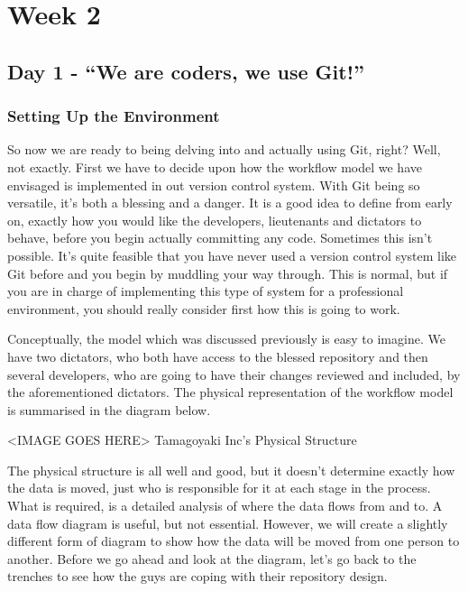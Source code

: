\chapter{Week 2}
\section{Day 1 - ``We are coders, we use Git!''}
\subsection{Setting Up the Environment}

So now we are ready to being delving into and actually using Git, right?  Well, not exactly.  First we have to decide upon how the workflow model we have envisaged is implemented in out version control system.  With Git being so versatile, it's both a blessing and a danger.  It is a good idea to define from early on, exactly how you would like the developers, lieutenants and dictators to behave, before you begin actually committing any code.  Sometimes this isn't possible.  It's quite feasible that you have never used a version control system like Git before and you begin by muddling your way through.  This is normal, but if you are in charge of implementing this type of system for a professional environment, you should really consider first how this is going to work. 

Conceptually, the model which was discussed previously is easy to imagine.  We have two dictators, who both have access to the blessed repository and then several developers, who are going to have their changes reviewed and included, by the aforementioned dictators.  The physical representation of the workflow model is summarised in the diagram below.

<IMAGE GOES HERE>
Tamagoyaki Inc's Physical Structure

The physical structure is all well and good, but it doesn't determine exactly how the data is moved, just who is responsible for it at each stage in the process.  What is required, is a detailed analysis of where the data flows from and to.  A data flow diagram is useful, but not essential.  However, we will create a slightly different form of diagram to show how the data will be moved from one person to another.  Before we go ahead and look at the diagram, let's go back to the trenches to see how the guys are coping with their repository design. 

